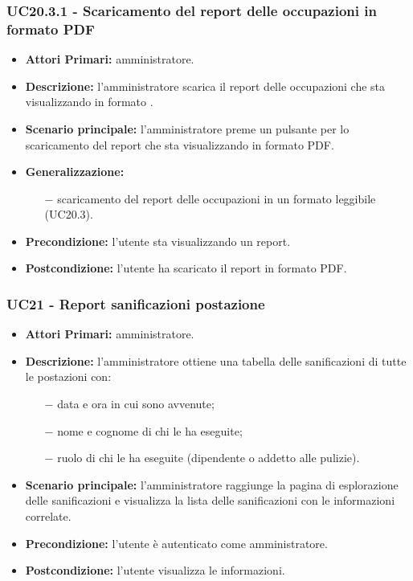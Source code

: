 \subsubsection{ UC20.3.1 - Scaricamento del report delle occupazioni in formato PDF}
\begin{itemize}
	\item\textbf{Attori Primari:} 
	amministratore.
	\item\textbf{Descrizione:} 
	l'amministratore scarica il report delle occupazioni che sta visualizzando in formato .
	\item\textbf{Scenario principale:} 
	l'amministratore preme un pulsante per lo scaricamento del report che sta visualizzando in formato PDF.
	\item\textbf{Generalizzazione:}
	\begin{itemize}
		\item[$-$] scaricamento del report delle occupazioni in un formato leggibile (UC20.3).
	\end{itemize}
	\item\textbf{Precondizione:} 
	l'utente sta visualizzando un report.
	\item\textbf{Postcondizione:}
	l'utente ha scaricato il report in formato PDF.
\end{itemize}


\subsubsection{ UC21 - Report sanificazioni postazione}
\begin{itemize}
           	\item\textbf{Attori Primari:} 
           	amministratore.
           	\item\textbf{Descrizione:} 
           	l'amministratore ottiene una tabella delle sanificazioni di tutte le postazioni con:
           	\begin{itemize}
           		\item[$-$] data e ora in cui sono avvenute;
           		\item[$-$] nome e cognome di chi le ha eseguite;
           		\item[$-$] ruolo di chi le ha eseguite (dipendente o addetto alle pulizie).
           	\end{itemize}
           	\item\textbf{Scenario principale:} 
           	l'amministratore raggiunge la pagina di esplorazione delle sanificazioni e visualizza la lista delle sanificazioni con le informazioni correlate.
           	\item\textbf{Precondizione:} 
           	l'utente è autenticato come amministratore.
           	\item\textbf{Postcondizione:}
           	l'utente visualizza le informazioni.
\end{itemize}

